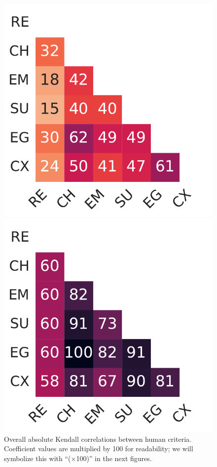 \begin{figure}[h]
\centering
\begin{minipage}{0.45\columnwidth}
    \centering
    \includegraphics[width=\columnwidth]{pictures/criteria_story_kendall.pdf}
    \caption{Overall absolute Kendall correlations between human criteria. Coefficient values are multiplied by 100 for readability; we will symbolize this with ``($\times$100)'' in the next figures.}
    \label{fig:overall_human_correlations}
\end{minipage}
\hspace{0.2cm}
\begin{minipage}{0.45\columnwidth}
    \centering
    \includegraphics[width=\columnwidth]{pictures/criteria_system_kendall.pdf}

\end{minipage}
\end{figure}
